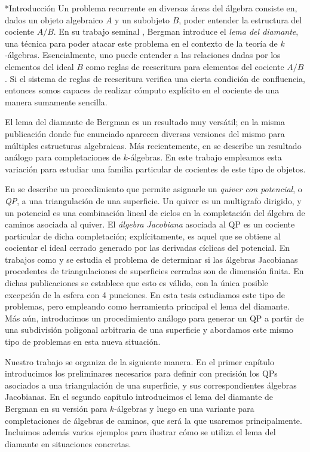 \begin{chapter}*{Introducción}
Un problema recurrente en diversas áreas del álgebra consiste en, dados un objeto algebraico $A$ y un subobjeto $B$, poder entender la estructura del cociente $A/B$. En su trabajo seminal \cite{Ber78}, Bergman introduce el \emph{lema del diamante}, una técnica para poder atacar este problema en el contexto de la teoría de $k$-álgebras. Esencialmente, uno puede entender a las relaciones dadas por los elementos del ideal $B$ como reglas de reescritura para elementos del cociente $A/B$. Si el sistema de reglas de reescritura verifica una cierta condición de confluencia, entonces somos capaces de realizar cómputo explícito en el cociente de una manera sumamente sencilla.

El lema del diamante de Bergman es un resultado muy versátil; en la misma publicación donde fue enunciado aparecen diversas versiones del mismo para múltiples estructuras algebraicas. Más recientemente, en \cite{SAV15} se describe un resultado análogo para completaciones de $k$-álgebras. En este trabajo empleamos esta variación para estudiar una familia particular de cocientes de este tipo de objetos.

En \cite{DWZ08} se describe un procedimiento que permite asignarle un \emph{quiver con potencial}, o \emph{QP}, a una triangulación de una superficie. Un quiver es un multigrafo dirigido, y un potencial es una combinación lineal de ciclos en la completación del álgebra de caminos asociada al quiver. El \emph{álgebra Jacobiana} asociada al QP es un cociente particular de dicha completación; explícitamente, es aquel que se obtiene al cocientar el ideal cerrado generado por las derivadas cíclicas del potencial. En trabajos como \cite{Lad12} y \cite{TVD12} se estudia el problema de determinar si las álgebras Jacobianas procedentes de triangulaciones de superficies cerradas son de dimensión finita. En dichas publicaciones se establece que esto es válido, con la única posible excepción de la esfera con 4 punciones. En esta tesis estudiamos este tipo de problemas, pero empleando como herramienta principal el lema del diamante. Más aún, introducimos un procedimiento análogo para generar un QP a partir de una subdivisión poligonal arbitraria de una superficie y abordamos este mismo tipo de problemas en esta nueva situación.

Nuestro trabajo se organiza de la siguiente manera. En el primer capítulo introducimos los preliminares necesarios para definir con precisión los QPs asociados a una triangulación de una superficie, y sus correspondientes álgebras Jacobianas. En el segundo capítulo introducimos el lema del diamante de Bergman en su versión para $k$-álgebras y luego en una variante para completaciones de álgebras de caminos, que será la que usaremos principalmente. Incluimos además varios ejemplos para ilustrar cómo se utiliza el lema del diamante en situaciones concretas.


\end{chapter}
